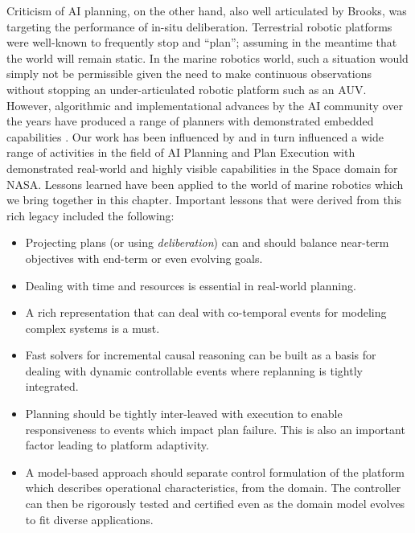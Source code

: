 Criticism of AI planning, on the other hand, also well articulated by
Brooks, was targeting the performance of in-situ
deliberation. Terrestrial robotic platforms were well-known to
frequently stop and ``plan''; assuming in the meantime that the world
will remain static. In the marine robotics world, such a situation
would simply not be permissible given the need to make continuous
observations without stopping an under-articulated robotic platform
such as an AUV. However, algorithmic and implementational advances by
the AI community over the years have produced a range of planners with
demonstrated embedded capabilities
\cite{simmons94,Haigh98,alami:1998p820,chien00,mus98,teichteil07}. Our
work has been influenced by and in turn influenced a wide range of
activities in the field of AI Planning and Plan Execution with
demonstrated real-world and highly visible capabilities in the Space
domain \cite{mus98,rajan00,aichang04,bresina05} for NASA. Lessons
learned have been applied to the world of marine robotics which we
bring together in this chapter. Important lessons that were derived
from this rich legacy included the following:

\begin{itemize}

\item Projecting plans (or using \emph{deliberation}) can and should
  balance near-term objectives with end-term or even evolving goals.

\item Dealing with time and resources is essential in real-world
  planning.

\item A rich representation that can deal with co-temporal events for
  modeling complex systems is a must.

\item Fast solvers for incremental causal reasoning can be built as a
  basis for dealing with dynamic controllable events where replanning
  is tightly integrated.

\item Planning should be tightly inter-leaved with execution to enable
  responsiveness to events which impact plan failure. This is also an
  important factor leading to platform adaptivity.

\item A model-based approach should separate control formulation of
  the platform which describes operational characteristics, from the
  domain. The controller can then be rigorously tested and certified
  even as the domain model evolves to fit diverse applications.

\end{itemize}

